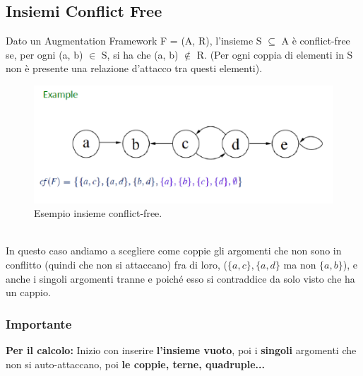 \subsection{Insiemi Conflict Free}
Dato un Augmentation Framework F = (A, R), l'insieme S $\subseteq$ A è
conflict-free se, per ogni (a, b) $\in$ S, si ha che (a, b) $\notin$ R. (Per
ogni coppia di elementi in S non è presente una relazione d'attacco tra questi
elementi).
\begin{figure}[htp]
    \centering
    \includegraphics[width=12cm, keepaspectratio]{img/Cap6/cf.png}
    \caption{Esempio insieme conflict-free.}
\end{figure}
\\In questo caso andiamo a scegliere come coppie gli argomenti che non sono in
conflitto (quindi che non si attaccano) fra di loro, ($\{a,c\},\{a,d\}$ ma non $\{a,b\}$),
e anche i singoli argomenti tranne e poiché esso si contraddice da solo visto
che ha un cappio.

\subsubsection{\textbf{Importante}} \textbf{Per il calcolo:} Inizio con inserire
\textbf{l'insieme vuoto}, poi i \textbf{singoli} argomenti che non si
auto-attaccano, poi \textbf{le coppie, terne, quadruple...}

